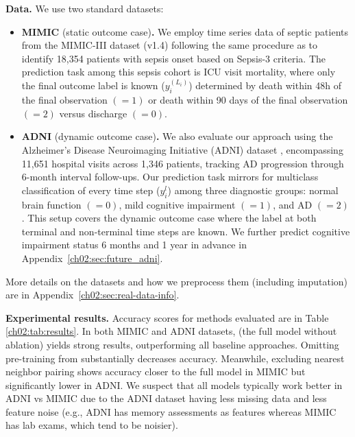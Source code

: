 \noindent
\textbf{Data.}
We use two standard datasets: %
\begin{itemize}
\item[$\bullet$]
\textbf{MIMIC }(static outcome case)\textbf{.}
We employ time series data of septic patients from the MIMIC-III dataset (v1.4) \citep{johnson2018mimic} following the same procedure as \citet{komorowski2018artificial} to identify 18,354 patients with sepsis onset based on Sepsis-3 criteria. 
The prediction task among this sepsis cohort is ICU visit mortality, where only the final outcome label is known 
 ($y_i^{(L_i)}$) determined by death within 48h of the final observation $(=1)$ or death within 90 days of the final observation $(=2)$ versus discharge $(=0)$.

\item[$\bullet$]
\textbf{ADNI }(dynamic outcome case)\textbf{.} 
We also evaluate our approach using the Alzheimer's Disease Neuroimaging Initiative (ADNI) dataset \citep{petersen2010alzheimer}, encompassing 11,651 hospital visits across 1,346 patients, tracking AD progression through 6-month interval follow-ups.
Our prediction task mirrors \cite{lee2020outcome} for multiclass classification of every time step ($y_i^{l}$) among three diagnostic groups: normal brain function $(=0)$, mild cognitive impairment $(=1)$, and AD $(=2)$.
This setup covers the dynamic outcome case where the label at both terminal and non-terminal time steps are known.
We further predict cognitive impairment status 6 months and 1 year in advance in Appendix~\ref{ch02:sec:future_adni}.

\end{itemize}
More details on the datasets and how we preprocess them (including imputation) are in Appendix~\ref{ch02:sec:real-data-info}.

\noindent
\textbf{Experimental results.} Accuracy scores for methods evaluated are in Table \ref{ch02:tab:results}. In both MIMIC and ADNI datasets,  (the full model without ablation) yields strong results, outperforming all baseline approaches. Omitting pre-training from  substantially decreases accuracy. Meanwhile, excluding nearest neighbor pairing shows accuracy closer to the full model in MIMIC but significantly lower in ADNI. We suspect that all models typically work better in ADNI vs MIMIC due to the ADNI dataset having less missing data and less feature noise (e.g., ADNI has memory assessments as features whereas MIMIC has lab exams, which tend to be noisier). 

